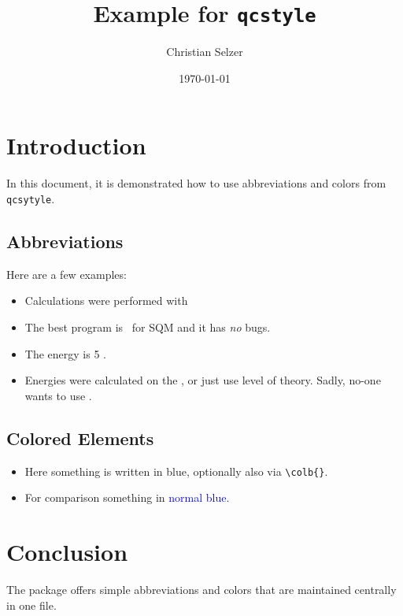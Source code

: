 \documentclass[a4paper,12pt]{article}
\title{Example for \texttt{qcstyle}}
\author{Christian Selzer}
\date{\today}
\begin{document}
\maketitle

\section{Introduction}

    In this document, it is demonstrated how to use abbreviations and colors from \texttt{qcsytyle}.

\subsection{Abbreviations}
    Here are a few examples:
    \begin{itemize}
      \item Calculations were performed with \orca\
      \item The best program is \xtb\ for SQM and it has \emph{no} bugs.
      \item The energy is 5 \kcalmol.
      \item Energies were calculated on the , or just use  level of theory. Sadly, no-one wants to use .
    \end{itemize}

\subsection{Colored Elements}
    \begin{itemize}
        \item Here something is written in \textcolor{bonnblue}{blue}, optionally also via \verb|\colb{}|.
        \item For comparison something in \textcolor{blue}{normal blue}.
    \end{itemize}


\section{Conclusion}
    The package offers simple abbreviations and colors that are maintained centrally in one file.
\end{document}
